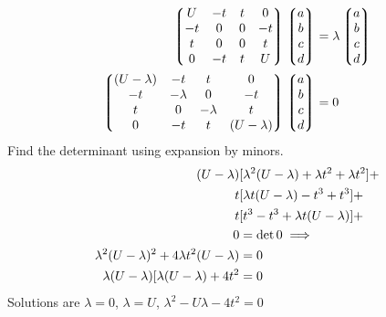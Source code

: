 \documentclass{amsart}
\begin{document}
\begin{align*}
\Pmqty{U&-t&t&0 \\-t&0&0&-t \\t&0&0&t \\0&-t&t&U}\Pmqty{a\\b\\c\\d}&=\lambda\Pmqty{a\\b\\c\\d}\\
\Pmqty{(U-\lambda)&-t&t&0 \\-t&-\lambda&0&-t \\t&0&-\lambda&t \\0&-t&t&(U-\lambda)}\Pmqty{a\\b\\c\\d}&=0\\
\end{align*}
Find the determinant using expansion by minors.
\begin{align*}
(U-\lambda)&[\lambda^2(U-\lambda)+\lambda t^2+\lambda t^2]+\\
t&[\lambda t(U-\lambda)-t^3+t^3]+\\
t&[t^3-t^3+\lambda t(U-\lambda)]+\\
0&=\determinant 0 \implies\\
\lambda^2(U-\lambda)^2+4\lambda t^2(U-\lambda)&=0\\
\lambda(U-\lambda)[\lambda(U-\lambda)+4t^2&=0
\end{align*}
Solutions are $\lambda=0$, $\lambda=U$, $\lambda^2 -U\lambda -4t^2=0$
\end{document}
